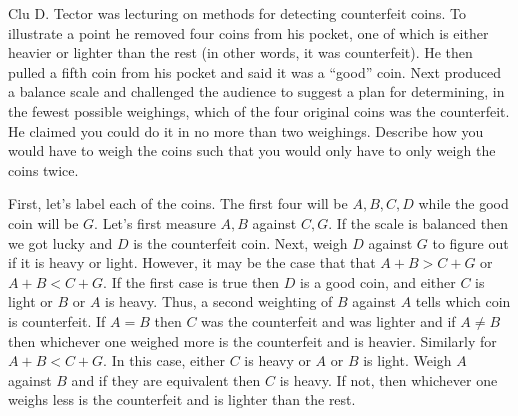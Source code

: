 \begin{questions}
 Clu D. Tector was lecturing on methods for detecting counterfeit coins. To illustrate a point he removed four coins from his pocket, one of which is either heavier or lighter than the rest (in other words, it was counterfeit). He then pulled a fifth coin from his pocket and said it was a ``good'' coin. Next produced a balance scale and challenged the audience to suggest a plan for determining, in the fewest possible weighings, which of the four original coins was the counterfeit. He claimed you could do it in no more than two weighings. Describe how you would have to weigh the coins such that you would only have to only weigh the coins twice.
\begin{solution}
	First, let's label each of the coins. The first four will be $A,B,C,D$ while the good coin will be $G$. Let's first measure $A,B$ against $C, G$. If the scale is balanced then we got lucky and $D$ is the counterfeit coin. Next, weigh $D$ against $G$ to figure out if it is heavy or light. However, it may be the case that that $A+B > C+G$ or $A+B < C+G$. If the first case is true then $D$ is a good coin, and either $C$ is light or $B$ or $A$ is heavy. Thus, a second weighting of $B$ against $A$ tells which coin is counterfeit. If $A=B$ then $C$ was the counterfeit and was lighter and if $A \not=B$ then whichever one weighed more is the counterfeit and is heavier. Similarly for $A+B<C+G$. In this case, either $C$ is heavy or $A$ or $B$ is light. Weigh $A$ against $B$ and if they are equivalent then $C$ is heavy. If not, then whichever one weighs less is the counterfeit and is lighter than the rest.
\end{solution}



\end{questions}



